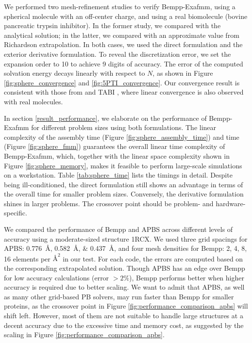 We performed two mesh-refinement studies to verify Bempp-Exafmm, using a spherical molecule with an off-center charge, and using a real biomolecule (bovine pancreatic trypsin inhibitor).
In the former study, we compared with the analytical solution; in the latter, we compared with an approximate value from Richardson extrapolation.
In both cases, we used the direct formulation and the exterior derivative formulation.
To reveal the discretization error, we set the \fmm expansion order to 10 to achieve 9 digits of accuracy.
The error of the computed solvation energy decays linearly with respect to $N$, as shown in Figure \ref{fig:sphere_convergence} and \ref{fig:5PTI_convergence}.
Our convergence result is consistent with those from \pygbe \cite{CooperBardhanBarba2014} and TABI \cite{GengKrasny2013}, where linear convergence is also observed with real molecules.

In section \ref{result_performance}, we elaborate on the performance of Bempp-Exafmm for different problem sizes using both formulations.
The linear complexity of the assembly time (Figure \ref{fig:sphere_assembly_time}) and \fmm time (Figure \ref{fig:sphere_fmm}) guarantees the overall linear time complexity of Bempp-Exafmm, which, together with the linear space complexity shown in Figure \ref{fig:sphere_memory}, makes it feasible to perform large-scale simulations on a workstation.
Table \ref{tab:sphere_time} lists the timings in detail.
Despite being ill-conditioned, the direct formulation still shows an advantage in terms of the overall time for smaller problem sizes.
Conversely, the derivative formulation shines in larger problems.
The crossover point should be problem- and hardware-specific.

We compared the performance of Bempp and APBS across different levels of accuracy using a moderate-sized structure 1RCX.
We used three grid spacings for APBS: \SIlist{0.776;0.582;0.437}{\angstrom}, and four mesh densities for Bempp: 2, 4, 8, 16 elements per $\si{\angstrom}^{2}$ in our test.
For each code, the errors are computed based on the corresponding extrapolated solution.
Though APBS has an edge over Bempp for low accuracy calculations (error $>2\%$), Bempp performs better when higher accuracy is required due to better scaling.
We want to admit that APBS, as well as many other grid-based PB solvers, may run faster than Bempp for smaller proteins, as the crossover point in Figure \ref{fig:performance_comparison_apbs} will shift left.
However, most of them are not suitable to handle large structures at a decent accuracy due to the excessive time and memory cost, as suggested by the scaling in Figure \ref{fig:performance_comparison_apbs}.


